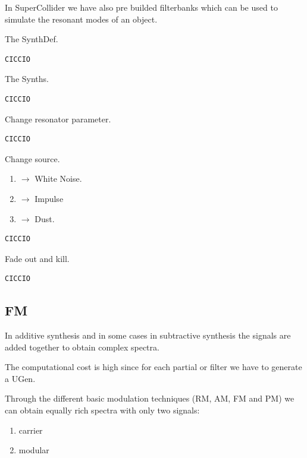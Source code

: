 In SuperCollider we have also pre builded filterbanks which can be used to simulate the resonant modes of an object.

The SynthDef.

\begin{lstlisting}[frame=single] 
CICCIO
\end{lstlisting}

The Synths.

\begin{lstlisting}[frame=single] 
CICCIO
\end{lstlisting}

Change resonator parameter.

\begin{lstlisting}[frame=single] 
CICCIO
\end{lstlisting}

Change source. 

\begin{enumerate}
\def\labelenumi{\arabic{enumi}.}
\setcounter{enumi}{1}
\tightlist
\item \(\rightarrow\) White Noise. 
\item \(\rightarrow\) Impulse
\item \(\rightarrow\) Dust.
\end{enumerate}

\begin{lstlisting}[frame=single] 
CICCIO
\end{lstlisting}

Fade out and kill.

\begin{lstlisting}[frame=single] 
CICCIO
\end{lstlisting}

\subsection{FM}\label{fm}

In additive synthesis and in some cases in subtractive synthesis the signals are added together to obtain complex spectra.

The computational cost is high since for each partial or filter we have to generate a UGen.

Through the different basic modulation techniques (RM, AM, FM and PM) we can obtain equally rich spectra with only two signals: 

\begin{enumerate}
\tightlist 
\item carrier 
\item modular
\end{enumerate}

